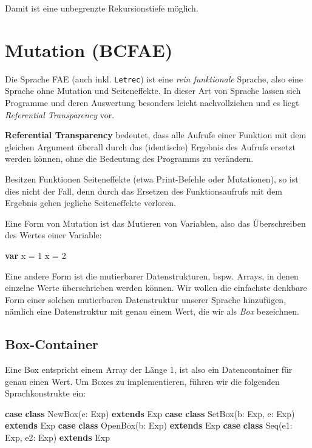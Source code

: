 \documentclass[]{article}
\newenvironment{Shaded}{}{}
\newcommand{\DecValTok}[1]{\textcolor[rgb]{0.25,0.63,0.44}{#1}}
\newcommand{\FunctionTok}[1]{\textcolor[rgb]{0.02,0.16,0.49}{#1}}
\newcommand{\KeywordTok}[1]{\textcolor[rgb]{0.00,0.44,0.13}{\textbf{#1}}}
\newcommand{\NormalTok}[1]{#1}
\begin{document}
Damit ist eine unbegrenzte Rekursionstiefe möglich.

\hypertarget{mutation-bcfae}{%
\section{Mutation (BCFAE)}\label{mutation-bcfae}}

Die Sprache FAE (auch inkl. \texttt{Letrec}) ist eine \emph{rein
funktionale} Sprache, also eine Sprache ohne Mutation und Seiteneffekte.
In dieser Art von Sprache lassen sich Programme und deren Auswertung
besonders leicht nachvollziehen und es liegt \emph{Referential
Transparency} vor.

\textbf{Referential Transparency} bedeutet, dass alle Aufrufe einer
Funktion mit dem gleichen Argument überall durch das (identische)
Ergebnis des Aufrufs ersetzt werden können, ohne die Bedeutung des
Programms zu verändern.

Besitzen Funktionen Seiteneffekte (etwa Print-Befehle oder Mutationen),
so ist dies nicht der Fall, denn durch das Ersetzen des Funktionsaufrufs
mit dem Ergebnis gehen jegliche Seiteneffekte verloren.

Eine Form von Mutation ist das Mutieren von Variablen, also das
Überschreiben des Wertes einer Variable:

\begin{Shaded}
\begin{Highlighting}[]
\KeywordTok{var}\NormalTok{ x = }\DecValTok{1}
\NormalTok{x = }\DecValTok{2}
\end{Highlighting}
\end{Shaded}

Eine andere Form ist die mutierbarer Datenstrukturen, bspw. Arrays, in
denen einzelne Werte überschrieben werden können. Wir wollen die
einfachste denkbare Form einer solchen mutierbaren Datenstruktur unserer
Sprache hinzufügen, nämlich eine Datenstruktur mit genau einem Wert, die
wir als \emph{Box} bezeichnen.

\hypertarget{box-container}{%
\subsection{Box-Container}\label{box-container}}

Eine Box entspricht einem Array der Länge 1, ist also ein Datencontainer
für genau einen Wert. Um Boxes zu implementieren, führen wir die
folgenden Sprachkonstrukte ein:

\begin{Shaded}
\begin{Highlighting}[]
\KeywordTok{case} \KeywordTok{class} \FunctionTok{NewBox}\NormalTok{(e: Exp) }\KeywordTok{extends}\NormalTok{ Exp}
\KeywordTok{case} \KeywordTok{class} \FunctionTok{SetBox}\NormalTok{(b: Exp, e: Exp) }\KeywordTok{extends}\NormalTok{ Exp}
\KeywordTok{case} \KeywordTok{class} \FunctionTok{OpenBox}\NormalTok{(b: Exp) }\KeywordTok{extends}\NormalTok{ Exp}
\KeywordTok{case} \KeywordTok{class}\NormalTok{ Seq(e1: Exp, e2: Exp) }\KeywordTok{extends}\NormalTok{ Exp}
\end{Highlighting}
\end{Shaded}
\end{document}
